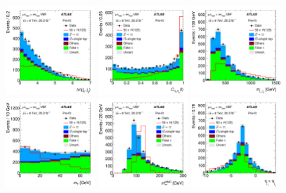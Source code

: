 \begin{figure}[tp]
  \centering
  \includegraphics[width=0.30\textwidth]{figures/HIGG-2013-32/fig_02c}
  \includegraphics[width=0.30\textwidth]{figures/HIGG-2013-32/figaux_06a}
  \includegraphics[width=0.30\textwidth]{figures/HIGG-2013-32/figaux_06b}
  \includegraphics[width=0.30\textwidth]{figures/HIGG-2013-32/figaux_06c}
  \includegraphics[width=0.30\textwidth]{figures/HIGG-2013-32/figaux_06d}
  \includegraphics[width=0.30\textwidth]{figures/HIGG-2013-32/figaux_06e}

\end{figure}
